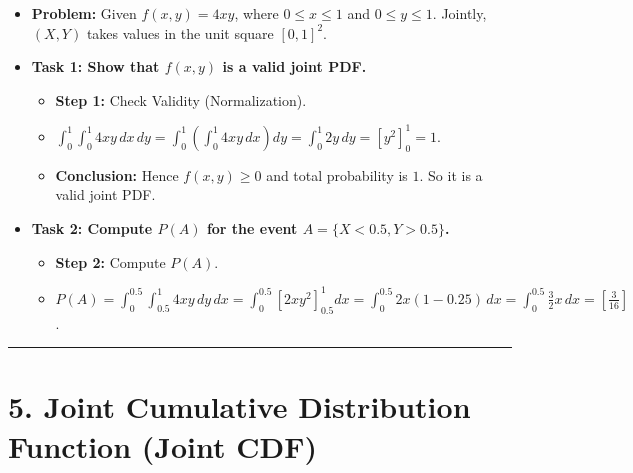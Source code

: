 \documentclass{article}
\begin{document}
\begin{itemize}[label=\textbullet]
    \item \textbf{Problem:} Given $f(x, y) = 4xy$, where $0 \le x \le 1$ and $0 \le y \le 1$. Jointly, $(X, Y)$ takes values in the unit square $[0, 1]^2$.
    \item \textbf{Task 1: Show that $f(x, y)$ is a valid joint PDF.}
    \begin{itemize}[label=$\circ$]
        \item \textbf{Step 1:} Check Validity (Normalization).
        \item $\int_{0}^{1} \int_{0}^{1} 4xy \, dx \, dy = \int_{0}^{1} \left( \int_{0}^{1} 4xy \, dx \right) dy = \int_{0}^{1} 2y \, dy = \left[ y^2 \right]_{0}^{1} = 1$.
        \item \textbf{Conclusion:} Hence $f(x, y) \ge 0$ and total probability is $1$. So it is a valid joint PDF.
    \end{itemize}
    \item \textbf{Task 2: Compute $P(A)$ for the event $A = \{X < 0.5, Y > 0.5\}$.}
    \begin{itemize}[label=$\circ$]
        \item \textbf{Step 2:} Compute $P(A)$.
        \item $P(A) = \int_{0}^{0.5} \int_{0.5}^{1} 4xy \, dy \, dx = \int_{0}^{0.5} \left[ 2xy^2 \right]_{0.5}^{1} dx = \int_{0}^{0.5} 2x(1 - 0.25) \, dx = \int_{0}^{0.5} \frac{3}{2}x \, dx = \left[ \frac{3}{16} \right]$.
    \end{itemize}
\end{itemize}

\vspace{0.25cm}
\hrule
\vspace{0.25cm}

\section*{5. Joint Cumulative Distribution Function (Joint CDF)}
\end{document}
